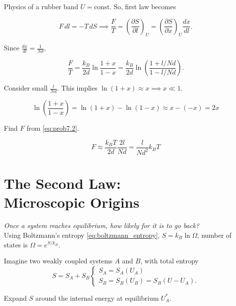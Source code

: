 \begin{problem}{Physics of a rubber band}
$U=\mathrm{const.}$ So, first law becomes

\begin{equation}
    F\,dl=-T\,dS \implies \frac{F}{T}=\left(\frac{\partial S}{\partial l}\right)_U=\left(\frac{\partial S}{\partial x}\right)_U \frac{dx}{dl}.
\end{equation}

Since $\frac{dx}{dl}=\frac{1}{Nd}$,

\begin{equation}
    \frac{F}{T}=\frac{k_B}{2d}\ln{\frac{1+x}{1-x}}=\frac{k_B}{2d}\ln{\left(\frac{1+l/Nd}{1-l/Nd}\right)}.
    \label{eq:prob7.2}
\end{equation}

Consider small $\frac{l}{Nd}$. This implies $\ln{(1+x)}\approx x \implies x\ll1$.

\begin{equation}
    \ln{\left(\frac{1+x}{1-x}\right)} = \ln(1+x) - \ln(1-x) \approx x - (-x)=2x
\end{equation}

Find $F$ from \ref{eq:prob7.2}.

\begin{equation}
    F \approx\frac{k_B T}{2d}\frac{2l}{Nd}=\frac{l}{Nd^2}k_B T
\end{equation}

\end{problem}

\section{The Second Law:\\ Microscopic Origins}

\emph{Once a system reaches equilibrium, how likely for it is to go back?}\\

Using Boltzmann's entropy \ref{eq:boltzmann_entropy}, $S=k_B \ln \Omega$, number of states is $\Omega=e^{S/k_B}$.

Imagine two weakly coupled systems $A$ and $B$, with total entropy 
\begin{equation}
S=S_A+S_B 
    \begin{cases}
        S_A=S_A(U_A) \\
    S_B=S_B(U_B)=S_B(U-U_A).
    \end{cases}
\end{equation}

Expand $S$ around the internal energy at equilibrium $U_A^*$.

